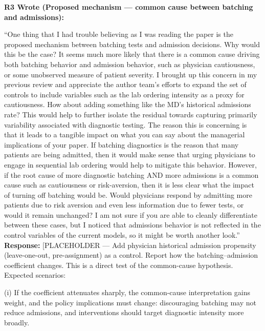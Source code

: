 \documentclass[11pt]{article}
\newenvironment{quote2}
{ \bigskip
\noindent
         \small\em
         \baselineskip=14pt
}
\newcommand{\1}{\hbox{\rm 1\kern-.35em 1}}
\begin{document}
\begin{quote2}
\textbf{R3 Wrote (Proposed mechanism --- common cause between batching and admissions):}

\noindent ``One thing that I had trouble believing as I was reading the paper is the proposed mechanism between batching tests and admission decisions. Why would this be the case? It seems much more likely that there is a common cause driving both batching behavior and admission behavior, such as physician cautiousness, or some unobserved measure of patient severity. I brought up this concern in my previous review and appreciate the author team's efforts to expand the set of controls to include variables such as the lab ordering intensity as a proxy for cautiousness. How about adding something like the MD's historical admissions rate? This would help to further isolate the residual towards capturing primarily variability associated with diagnostic testing. The reason this is concerning is that it leads to a tangible impact on what you can say about the managerial implications of your paper. If batching diagnostics is the reason that many patients are being admitted, then it would make sense that urging physicians to engage in sequential lab ordering would help to mitigate this behavior. However, if the root cause of more diagnostic batching AND more admissions is a common cause such as cautiousness or risk-aversion, then it is less clear what the impact of turning off batching would be. Would physicians respond by admitting more patients due to risk aversion and even less information due to fewer tests, or would it remain unchanged? I am not sure if you are able to cleanly differentiate between these cases, but I noticed that admissions behavior is not reflected in the control variables of the current models, so it might be worth another look.''
\end{quote2}

\noindent\textbf{Response:} \color{blue}[PLACEHOLDER --- Add physician historical admission propensity (leave-one-out, pre-assignment) as a control. Report how the batching--admission coefficient changes. This is a direct test of the common-cause hypothesis. Expected scenarios:

(i) If the coefficient attenuates sharply, the common-cause interpretation gains weight, and the policy implications must change: discouraging batching may not reduce admissions, and interventions should target diagnostic intensity more broadly.
\end{document}
